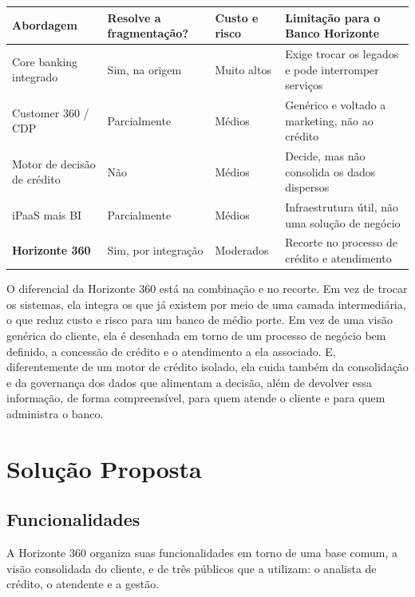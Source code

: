 \documentclass[12pt,a4paper]{article}
\begin{document}
\begin{table}[h]
\centering
\small
\renewcommand{\arraystretch}{1.3}
\begin{tabular}{|p{3.3cm}|p{3.0cm}|p{2.4cm}|p{5.4cm}|}
\hline
\textbf{Abordagem} & \textbf{Resolve a fragmenta\c{c}\~ao?} & \textbf{Custo e risco} & \textbf{Limita\c{c}\~ao para o Banco Horizonte}\\
\hline
Core banking integrado & Sim, na origem & Muito altos & Exige trocar os legados e pode interromper servi\c{c}os\\
\hline
Customer 360 / CDP & Parcialmente & M\'edios & Gen\'erico e voltado a marketing, n\~ao ao cr\'edito\\
\hline
Motor de decis\~ao de cr\'edito & N\~ao & M\'edios & Decide, mas n\~ao consolida os dados dispersos\\
\hline
iPaaS mais BI & Parcialmente & M\'edios & Infraestrutura \'util, n\~ao uma solu\c{c}\~ao de neg\'ocio\\
\hline
\textbf{Horizonte 360} & Sim, por integra\c{c}\~ao & Moderados & Recorte no processo de cr\'edito e atendimento\\
\hline
\end{tabular}
\end{table}

O diferencial da Horizonte 360 est\'a na combina\c{c}\~ao e no recorte. Em vez de trocar os sistemas, ela integra os que j\'a existem por meio de uma camada intermedi\'aria, o que reduz custo e risco para um banco de m\'edio porte. Em vez de uma vis\~ao gen\'erica do cliente, ela \'e desenhada em torno de um processo de neg\'ocio bem definido, a concess\~ao de cr\'edito e o atendimento a ela associado. E, diferentemente de um motor de cr\'edito isolado, ela cuida tamb\'em da consolida\c{c}\~ao e da governan\c{c}a dos dados que alimentam a decis\~ao, al\'em de devolver essa informa\c{c}\~ao, de forma compreens\'ivel, para quem atende o cliente e para quem administra o banco.

\section{Solu\c{c}\~ao Proposta}

\subsection{Funcionalidades}

A Horizonte 360 organiza suas funcionalidades em torno de uma base comum, a vis\~ao consolidada do cliente, e de tr\^es p\'ublicos que a utilizam: o analista de cr\'edito, o atendente e a gest\~ao.
\end{document}
